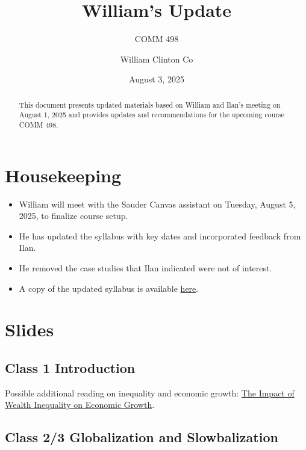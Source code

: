 \documentclass[
  11pt,
]{article}
\title{William's Update}
\subtitle{COMM 498}
\author{William Clinton Co}
\date{August 3, 2025}
\providecommand{\tightlist}{%
  \setlength{\itemsep}{0pt}\setlength{\parskip}{0pt}}
\renewcommand*\contentsname{Table of contents}
\newcommand\contentsname{Table of contents}
\begin{document}
\maketitle
\begin{abstract}
This document presents updated materials based on William and Ilan's
meeting on August 1, 2025 and provides updates and recommendations for
the upcoming course COMM 498.
\end{abstract}

\renewcommand*\contentsname{Table of contents}
{
\hypersetup{linkcolor=}
\setcounter{tocdepth}{3}
\tableofcontents
}

\section{Housekeeping}\label{housekeeping}

\begin{itemize}
\tightlist
\item
  William will meet with the Sauder Canvas assistant on Tuesday, August
  5, 2025, to finalize course setup.
\item
  He has updated the syllabus with key dates and incorporated feedback
  from Ilan.
\item
  He removed the case studies that Ilan indicated were not of interest.
\item
  A copy of the updated syllabus is available
  \href{https://github.com/WilliamClintC/Comm_498/blob/main/Slides/William_Update_Syllabus.docx}{here}.
\end{itemize}

\section{Slides}\label{slides}

\subsection{Class 1 Introduction}\label{class-1-introduction}

Possible additional reading on inequality and economic growth:
\href{https://cepr.org/voxeu/columns/impact-wealth-inequality-economic-growth-evidence-italy-during-its-structural}{The
Impact of Wealth Inequality on Economic Growth}.

\subsection{Class 2/3 Globalization and
Slowbalization}\label{class-23-globalization-and-slowbalization}
\end{document}
